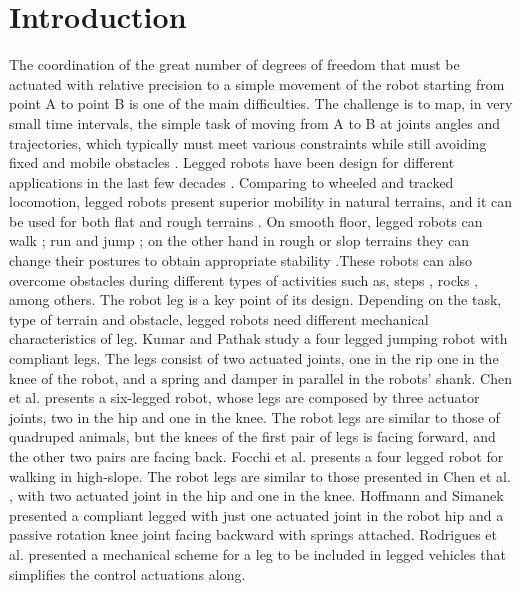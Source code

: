 \section{Introduction}
\label{intro}
The coordination of the great number of degrees of freedom that must be actuated with relative precision to a simple movement of the robot starting from point A to point B is one of the main difficulties. The challenge is to map, in very small time intervals, the simple task of moving from A to B at joints angles and trajectories, which typically must meet various constraints while still avoiding fixed and mobile obstacles \cite{berkemeier1998}. Legged robots have been design for different applications in the last few decades \cite{bares1999, kar2003, raibert2008, ponticelli2008, goncalves2015}. Comparing to wheeled and tracked locomotion, legged robots present superior mobility in natural terrains, and it can be used for both flat and rough terrains \cite{kumar2013}. On smooth floor, legged robots can walk \cite{chen2016,kar2003}; run \cite{heim2016,raibert2008} and jump \cite{kumar2013}; on the other hand in rough or slop terrains they can change their postures to obtain appropriate stability \cite{rebula2007,chen2018}.These robots can also overcome obstacles during different types of activities such as, steps \cite{nowicki2017}, rocks \cite{kimura2007}, among others. 
The robot leg is a key point of its design. Depending on the task, type of terrain and obstacle, legged robots need different mechanical characteristics of leg. Kumar and Pathak \cite{kumar2013} study a four legged jumping robot with compliant legs. The legs consist of two actuated joints, one in the rip one in the knee of the robot, and a spring and damper in parallel in the robots’ shank. Chen et al. \cite{chen2016} presents a six-legged robot, whose legs are composed by three actuator joints, two in the hip and one in the knee. The robot legs are similar to those of quadruped animals, but the knees of the first pair of legs is facing forward, and the other two pairs are facing back. Focchi et al. \cite{focchi2017} presents a four legged robot for walking in high-slope. The robot legs are similar to those presented in Chen et al. \cite{chen2016}, with two actuated joint in the hip and one in the knee. Hoffmann and Simanek \cite{hoffmann2017} presented a compliant legged with just one actuated joint in the robot hip and a passive rotation knee joint facing backward with springs attached. Rodrigues et al. \cite{rodrigues2011} presented a mechanical scheme for a leg to be included in legged vehicles that simplifies the control actuations along.
